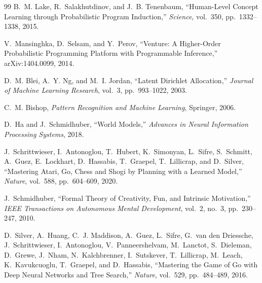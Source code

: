 \documentclass[11pt,a4paper]{article}
\theoremstyle{definition}
\theoremstyle{remark}
\begin{document}
\begin{thebibliography}{99}
B.~M. Lake, R.~Salakhutdinov, and J.~B. Tenenbaum,
\newblock ``Human-Level Concept Learning through Probabilistic Program Induction,''
\newblock \emph{Science}, vol.~350, pp.~1332--1338, 2015.

V.~Mansinghka, D.~Selsam, and Y.~Perov,
\newblock ``Venture: A Higher-Order Probabilistic Programming Platform with Programmable Inference,''
\newblock arXiv:1404.0099, 2014.

D.~M. Blei, A.~Y. Ng, and M.~I. Jordan,
\newblock ``Latent Dirichlet Allocation,''
\newblock \emph{Journal of Machine Learning Research}, vol.~3, pp.~993--1022, 2003.

C.~M. Bishop,
\newblock \emph{Pattern Recognition and Machine Learning},
\newblock Springer, 2006.

D.~Ha and J.~Schmidhuber,
\newblock ``World Models,''
\newblock \emph{Advances in Neural Information Processing Systems}, 2018.

J.~Schrittwieser, I.~Antonoglou, T.~Hubert, K.~Simonyan, L.~Sifre, S.~Schmitt, A.~Guez, E.~Lockhart, D.~Hassabis, T.~Graepel, T.~Lillicrap, and D.~Silver,
\newblock ``Mastering Atari, Go, Chess and Shogi by Planning with a Learned Model,''
\newblock \emph{Nature}, vol.~588, pp.~604--609, 2020.

J.~Schmidhuber,
\newblock ``Formal Theory of Creativity, Fun, and Intrinsic Motivation,''
\newblock \emph{IEEE Transactions on Autonomous Mental Development}, vol.~2, no.~3, pp.~230--247, 2010.

D.~Silver, A.~Huang, C.~J. Maddison, A.~Guez, L.~Sifre, G.~van den Driessche, J.~Schrittwieser, I.~Antonoglou, V.~Panneershelvam, M.~Lanctot, S.~Dieleman, D.~Grewe, J.~Nham, N.~Kalchbrenner, I.~Sutskever, T.~Lillicrap, M.~Leach, K.~Kavukcuoglu, T.~Graepel, and D.~Hassabis,
\newblock ``Mastering the Game of Go with Deep Neural Networks and Tree Search,''
\newblock \emph{Nature}, vol.~529, pp.~484--489, 2016.

\end{thebibliography}
\end{document}
